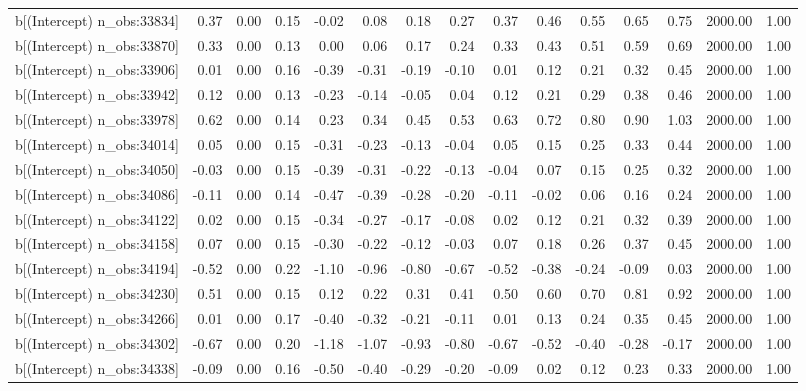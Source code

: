 \begin{table}[ht]
\begin{tabular}{rrrrrrrrrrrrrrr}
  b[(Intercept) n\_obs:33834] & 0.37 & 0.00 & 0.15 & -0.02 & 0.08 & 0.18 & 0.27 & 0.37 & 0.46 & 0.55 & 0.65 & 0.75 & 2000.00 & 1.00 \\ 
  b[(Intercept) n\_obs:33870] & 0.33 & 0.00 & 0.13 & 0.00 & 0.06 & 0.17 & 0.24 & 0.33 & 0.43 & 0.51 & 0.59 & 0.69 & 2000.00 & 1.00 \\ 
  b[(Intercept) n\_obs:33906] & 0.01 & 0.00 & 0.16 & -0.39 & -0.31 & -0.19 & -0.10 & 0.01 & 0.12 & 0.21 & 0.32 & 0.45 & 2000.00 & 1.00 \\ 
  b[(Intercept) n\_obs:33942] & 0.12 & 0.00 & 0.13 & -0.23 & -0.14 & -0.05 & 0.04 & 0.12 & 0.21 & 0.29 & 0.38 & 0.46 & 2000.00 & 1.00 \\ 
  b[(Intercept) n\_obs:33978] & 0.62 & 0.00 & 0.14 & 0.23 & 0.34 & 0.45 & 0.53 & 0.63 & 0.72 & 0.80 & 0.90 & 1.03 & 2000.00 & 1.00 \\ 
  b[(Intercept) n\_obs:34014] & 0.05 & 0.00 & 0.15 & -0.31 & -0.23 & -0.13 & -0.04 & 0.05 & 0.15 & 0.25 & 0.33 & 0.44 & 2000.00 & 1.00 \\ 
  b[(Intercept) n\_obs:34050] & -0.03 & 0.00 & 0.15 & -0.39 & -0.31 & -0.22 & -0.13 & -0.04 & 0.07 & 0.15 & 0.25 & 0.32 & 2000.00 & 1.00 \\ 
  b[(Intercept) n\_obs:34086] & -0.11 & 0.00 & 0.14 & -0.47 & -0.39 & -0.28 & -0.20 & -0.11 & -0.02 & 0.06 & 0.16 & 0.24 & 2000.00 & 1.00 \\ 
  b[(Intercept) n\_obs:34122] & 0.02 & 0.00 & 0.15 & -0.34 & -0.27 & -0.17 & -0.08 & 0.02 & 0.12 & 0.21 & 0.32 & 0.39 & 2000.00 & 1.00 \\ 
  b[(Intercept) n\_obs:34158] & 0.07 & 0.00 & 0.15 & -0.30 & -0.22 & -0.12 & -0.03 & 0.07 & 0.18 & 0.26 & 0.37 & 0.45 & 2000.00 & 1.00 \\ 
  b[(Intercept) n\_obs:34194] & -0.52 & 0.00 & 0.22 & -1.10 & -0.96 & -0.80 & -0.67 & -0.52 & -0.38 & -0.24 & -0.09 & 0.03 & 2000.00 & 1.00 \\ 
  b[(Intercept) n\_obs:34230] & 0.51 & 0.00 & 0.15 & 0.12 & 0.22 & 0.31 & 0.41 & 0.50 & 0.60 & 0.70 & 0.81 & 0.92 & 2000.00 & 1.00 \\ 
  b[(Intercept) n\_obs:34266] & 0.01 & 0.00 & 0.17 & -0.40 & -0.32 & -0.21 & -0.11 & 0.01 & 0.13 & 0.24 & 0.35 & 0.45 & 2000.00 & 1.00 \\ 
  b[(Intercept) n\_obs:34302] & -0.67 & 0.00 & 0.20 & -1.18 & -1.07 & -0.93 & -0.80 & -0.67 & -0.52 & -0.40 & -0.28 & -0.17 & 2000.00 & 1.00 \\ 
  b[(Intercept) n\_obs:34338] & -0.09 & 0.00 & 0.16 & -0.50 & -0.40 & -0.29 & -0.20 & -0.09 & 0.02 & 0.12 & 0.23 & 0.33 & 2000.00 & 1.00 \\ 

\end{tabular}
\end{table}
